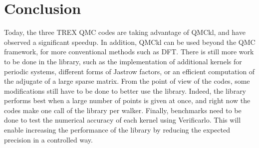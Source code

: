 \section{Conclusion}

Today, the three TREX QMC codes are taking advantage of QMCkl, and have
observed a significant speedup. In addition, QMCkl can be used beyond the QMC framework,
for more conventional methods such as \ac{DFT}. There is still more work to be
done in the library, such as the implementation of additional kernels for
periodic systems, different forms of Jastrow factors, or an efficient computation of the
adjugate of a large sparse matrix.
From the point of view of the codes, some modifications still have to be done to better use
the library. Indeed, the library performs best when a large number of points is given at once, and right now the codes make one call of the library per walker.
Finally, benchmarks need to be done to test the numerical accuracy of each kernel using
Verificarlo. 
This will enable increasing the performance of the library by reducing the expected precision in a controlled way.
